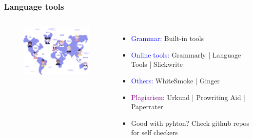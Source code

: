 \documentclass[newPxFont,sthlmFooter]{beamer}
\newcommand{\fs}{\footnotesize}
\begin{document}
\begin{frame}\frametitle{Language tools}
  \begin{columns}[T,onlytextwidth]
  \begin{figure}
    \centering
    \includegraphics[width=2in]{figs/world} 
  \end{figure}
  \begin{itemize}
  \fs
	\item \textcolor{blue}{Grammar:} Built-in tools
	\item \textcolor{blue}{Online tools:} Grammarly | Language Tools | Slickwrite
	\item \textcolor{blue}{Others:} WhiteSmoke | Ginger
	\item \textcolor{purple}{Plagiarism:} Urkund | Prowriting Aid | Paperrater
	\item Good with pyhton? Check github repos for self checkers
	\end{itemize}
  \vspace{-2cm}
  \end{columns}
\end{frame}
\end{document}
